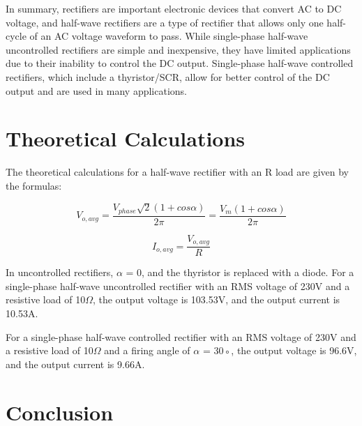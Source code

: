 In summary, rectifiers are important electronic devices that convert AC to DC voltage, and half-wave rectifiers are a type of rectifier that allows only one half-cycle of an AC voltage waveform to pass. While single-phase half-wave uncontrolled rectifiers are simple and inexpensive, they have limited applications due to their inability to control the DC output. Single-phase half-wave controlled rectifiers, which include a thyristor/SCR, allow for better control of the DC output and are used in many applications.



\section{Theoretical Calculations}
\hspace{\parindent}
The theoretical calculations for a half-wave rectifier with an R load are given by the formulas:


\begin{equation}
    V_{o,avg} =
    \frac{V_{phase}\sqrt{2} (1 + cos\alpha)}{2\pi} =
    \frac{V_m(1 + cos\alpha)}{ 2\pi}
\end{equation}

\begin{equation}
    I_{o,avg} =
    \frac{V_{o,avg}}{R}
\end{equation}

In uncontrolled rectifiers, $ \alpha$ = 0, and the thyristor is replaced with a diode.
For a single-phase half-wave uncontrolled rectifier with an RMS voltage of 230V
and a resistive load of 10$ \Omega $,
the output voltage is 103.53V, and the output current is 10.53A.

For a single-phase half-wave controlled rectifier with an RMS voltage of 230V
and a resistive load of 10$ \Omega $ and a firing angle of $ \alpha  $ = 30◦, the output voltage
is 96.6V, and the output current is 9.66A.

\pagebreak











\section{Conclusion}


